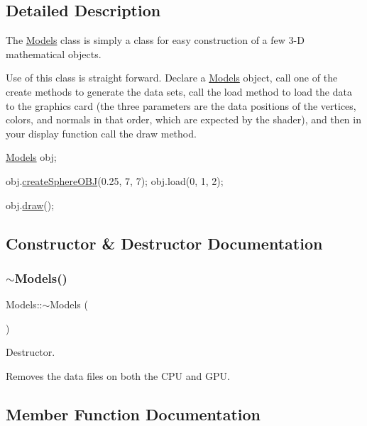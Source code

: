\subsection{Detailed Description}
The \hyperlink{class_models}{Models} class is simply a class for easy construction of a few 3-\/D mathematical objects. 

Use of this class is straight forward. Declare a \hyperlink{class_models}{Models} object, call one of the create methods to generate the data sets, call the load method to load the data to the graphics card (the three parameters are the data positions of the vertices, colors, and normals in that order, which are expected by the shader), and then in your display function call the draw method.


\begin{DoxyCode}
\hyperlink{class_models}{Models} obj;

obj.\hyperlink{class_models_a815ab35b893796d6d214f1bc68588dc1}{createSphereOBJ}(0.25, 7, 7);
obj.load(0, 1, 2);

obj.\hyperlink{class_models_a302e2de33467a2cdb283c9b34ced49b6}{draw}();
\end{DoxyCode}
 

\subsection{Constructor \& Destructor Documentation}
\mbox{\label{class_models_aef02b88508c7cf66170381982e57ce3e}} 
\subsubsection{\texorpdfstring{$\sim$\+Models()}{~Models()}}
{\footnotesize\ttfamily Models\+::$\sim$\+Models (\begin{DoxyParamCaption}{ }\end{DoxyParamCaption})}



Destructor. 

Removes the data files on both the C\+PU and G\+PU. 

\subsection{Member Function Documentation}
\mbox{\label{class_models_a4f35e25b5362120188dab01cd3e146cd}} 
